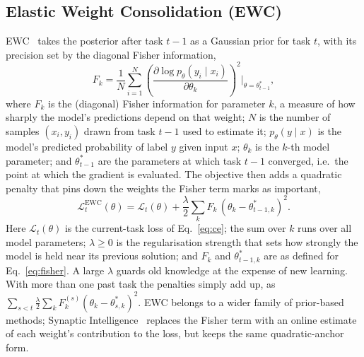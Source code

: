 \documentclass[11pt]{article}
\begin{document}
\subsection{Elastic Weight Consolidation (EWC)}
EWC~\cite{kirkpatrick2017} takes the posterior after task $t{-}1$ as a Gaussian
prior for task $t$, with its precision set by the diagonal Fisher information,
\begin{equation}
F_k=\frac{1}{N}\sum_{i=1}^{N}
\left(\frac{\partial\log p_\theta(y_i\mid x_i)}{\partial\theta_k}\right)^{\!2}
\Bigg|_{\theta=\theta^{*}_{t-1}},
\label{eq:fisher}
\end{equation}
where $F_k$ is the (diagonal) Fisher information for parameter $k$, a measure of
how sharply the model's predictions depend on that weight; $N$ is the number of
samples $(x_i,y_i)$ drawn from task $t{-}1$ used to estimate it; $p_\theta(y\mid
x)$ is the model's predicted probability of label $y$ given input $x$; $\theta_k$
is the $k$-th model parameter; and $\theta^{*}_{t-1}$ are the parameters at which
task $t{-}1$ converged, i.e.\ the point at which the gradient is evaluated. The
objective then adds a quadratic penalty that pins down the weights the Fisher
term marks as important,
\begin{equation}
\mathcal{L}^{\text{EWC}}_t(\theta)=\mathcal{L}_t(\theta)
+\frac{\lambda}{2}\sum_k F_k\,(\theta_k-\theta^{*}_{t-1,k})^2 .
\label{eq:ewc}
\end{equation}
Here $\mathcal{L}_t(\theta)$ is the current-task loss of Eq.~\eqref{eq:ce}; the
sum over $k$ runs over all model parameters; $\lambda\ge 0$ is the regularisation
strength that sets how strongly the model is held near its previous solution; and
$F_k$ and $\theta^{*}_{t-1,k}$ are as defined for Eq.~\eqref{eq:fisher}.
A large $\lambda$ guards old knowledge at the expense of new learning. With more
than one past task the penalties simply add up, as
$\sum_{s<t}\frac{\lambda}{2}\sum_k F_k^{(s)}(\theta_k-\theta^{*}_{s,k})^2$. EWC
belongs to a wider family of prior-based methods; Synaptic
Intelligence~\cite{zenke2017si} replaces the Fisher term with an online estimate
of each weight's contribution to the loss, but keeps the same quadratic-anchor
form.
\end{document}

